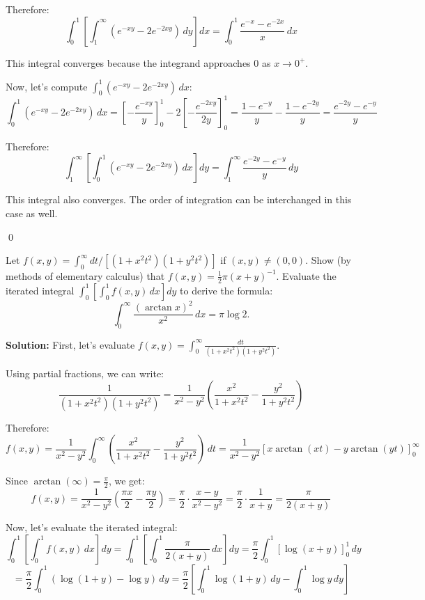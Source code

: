 \begin{enumerate}[label=(\alph*)]
    Therefore:
    \[\int_{0}^{1} \left[ \int_{1}^{\infty} (e^{-xy} - 2e^{-2xy}) \, dy \right] dx = \int_{0}^{1} \frac{e^{-x} - e^{-2x}}{x} \, dx\]
    
    This integral converges because the integrand approaches 0 as $x \to 0^+$.
    
    Now, let's compute $\int_{0}^{1} (e^{-xy} - 2e^{-2xy}) \, dx$:
    \[\int_{0}^{1} (e^{-xy} - 2e^{-2xy}) \, dx = \left[-\frac{e^{-xy}}{y}\right]_{0}^{1} - 2\left[-\frac{e^{-2xy}}{2y}\right]_{0}^{1} = \frac{1 - e^{-y}}{y} - \frac{1 - e^{-2y}}{y} = \frac{e^{-2y} - e^{-y}}{y}\]
    
    Therefore:
    \[\int_{1}^{\infty} \left[ \int_{0}^{1} (e^{-xy} - 2e^{-2xy}) \, dx \right] dy = \int_{1}^{\infty} \frac{e^{-2y} - e^{-y}}{y} \, dy\]
    
    This integral also converges. The order of integration can be interchanged in this case as well.
\end{enumerate}\qed


\begin{problembox}
Let $f(x, y) = \int_{0}^{\infty} dt / [(1 + x^{2}t^{2})(1 + y^{2}t^{2})]$ if $(x, y) \neq (0, 0)$. Show (by methods of elementary calculus) that $f(x, y) = \frac{1}{2}\pi(x + y)^{-1}$. Evaluate the iterated integral $\int_{0}^{1} \left[ \int_{0}^{1} f(x, y) \, dx \right] dy$ to derive the formula:
\[\int_{0}^{\infty} \frac{(\arctan x)^{2}}{x^{2}} \, dx = \pi \log 2.\]
\end{problembox}

\bigskip\noindent\textbf{Solution:}
First, let's evaluate $f(x, y) = \int_{0}^{\infty} \frac{dt}{(1 + x^{2}t^{2})(1 + y^{2}t^{2})}$.

Using partial fractions, we can write:
\[\frac{1}{(1 + x^{2}t^{2})(1 + y^{2}t^{2})} = \frac{1}{x^{2} - y^{2}} \left(\frac{x^{2}}{1 + x^{2}t^{2}} - \frac{y^{2}}{1 + y^{2}t^{2}}\right)\]

Therefore:
\[f(x, y) = \frac{1}{x^{2} - y^{2}} \int_{0}^{\infty} \left(\frac{x^{2}}{1 + x^{2}t^{2}} - \frac{y^{2}}{1 + y^{2}t^{2}}\right) \, dt = \frac{1}{x^{2} - y^{2}} \left[x \arctan(xt) - y \arctan(yt)\right]_{0}^{\infty}\]

Since $\arctan(\infty) = \frac{\pi}{2}$, we get:
\[f(x, y) = \frac{1}{x^{2} - y^{2}} \left(\frac{\pi x}{2} - \frac{\pi y}{2}\right) = \frac{\pi}{2} \cdot \frac{x - y}{x^{2} - y^{2}} = \frac{\pi}{2} \cdot \frac{1}{x + y} = \frac{\pi}{2(x + y)}\]

Now, let's evaluate the iterated integral:
\[\int_{0}^{1} \left[ \int_{0}^{1} f(x, y) \, dx \right] dy = \int_{0}^{1} \left[ \int_{0}^{1} \frac{\pi}{2(x + y)} \, dx \right] dy = \frac{\pi}{2} \int_{0}^{1} \left[ \log(x + y) \right]_{0}^{1} \, dy\]
\[= \frac{\pi}{2} \int_{0}^{1} (\log(1 + y) - \log y) \, dy = \frac{\pi}{2} \left[ \int_{0}^{1} \log(1 + y) \, dy - \int_{0}^{1} \log y \, dy \right]\]

